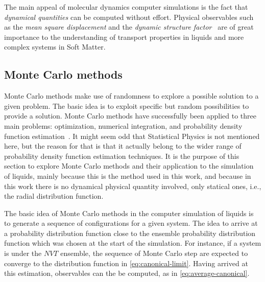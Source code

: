 The main appeal of molecular dynamics computer simulations is the fact that
\emph{dynamical quantities} can be computed without effort. Physical observables such
as the \emph{mean square displacement} and the \emph{dynamic structure factor}~\cite{dhontIntroductionDynamicsColloids1996,hansenTheorySimpleLiquids2013}
are of great importance to the understanding of transport properties in liquids and
more complex systems in Soft Matter.

\subsection{Monte Carlo methods}
Monte Carlo methods make use of randomness to explore a possible solution to a
given problem. The basic idea is to exploit specific but random possibilities
to provide a solution. Monte Carlo methods have successfully been applied to
three main problems: optimization, numerical integration, and probability density
function estimation~\cite{kroeseWhyMonteCarlo2014}. It might seem odd that Statistical
Physics is not mentioned here, but the reason for that is that it actually belong to
the wider range of probability density function estimation techniques. It is the
purpose of this section to explore Monte Carlo methods and their application to
the simulation of liquids, mainly because this is the method used in this
work, and because in this work there is no dynamical physical quantity involved,
only statical ones, i.e., the radial distribution function.

The basic idea of Monte Carlo methods in the computer simulation of liquids is to
generate a sequence of configurations for a given system. The idea to arrive at a
probability distribution function close to the ensemble probability distribution
function which was chosen at the start of the simulation. For instance, if a system
is under the $NVT$ ensemble, the sequence of Monte Carlo step are expected to converge
to the distribution function in \autoref{eq:canonical-limit}. Having arrived at this
estimation, observables can the be computed, as in \autoref{eq:average-canonical}.


